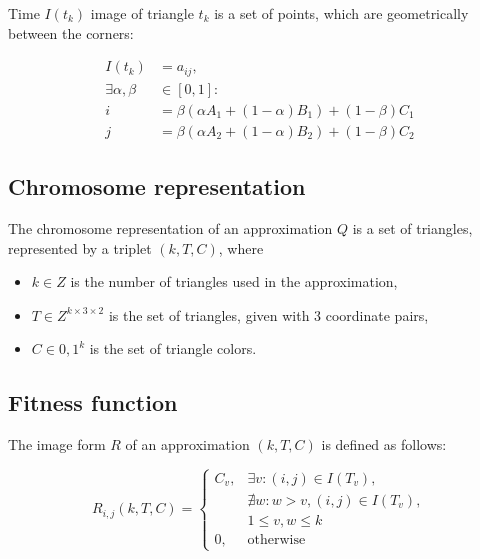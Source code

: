 \documentclass[conference]{IEEEtran}
\begin{document}
Time $I(t_k)$ image of triangle $t_k$ is a set of points, which are geometrically
between the corners:

\begin{equation}
	\begin{split}
	I(t_k) &= {a_{ij}},\\
	\exists \alpha, \beta &\in [0, 1]:\\
	i &= \beta(\alpha A_1 + (1-\alpha)B_1)+(1-\beta)C_1\\
	j &= \beta(\alpha A_2 + (1-\alpha)B_2)+(1-\beta)C_2
	\end{split}
\end{equation}

\subsection{Chromosome representation}

The chromosome representation of an approximation $Q$ is
a set of triangles, represented by a triplet $(k, T, C)$, where

\begin{itemize}

	\item{$k \in Z$ is the number of triangles used in the approximation,}

	\item{$T \in Z^{k \times 3 \times 2}$ is the set of triangles,
	given with 3 coordinate pairs,}

	\item{$C \in {0,1}^k$ is the set of triangle colors.}

\end{itemize}

\subsection{Fitness function}

The image form $R$ of an approximation $(k, T, C)$ is defined as follows:

\begin{equation}
	R_{i,j}(k, T, C)=
	\begin{cases}
		C_v,& \exists v: (i, j) \in I(T_v),\\
		    & \nexists w: w>v, (i, j) \in I(T_v),\\
				&1 \leq v, w \leq k\\
		0,  & \text{otherwise}
	\end{cases}
\end{equation}
\end{document}
